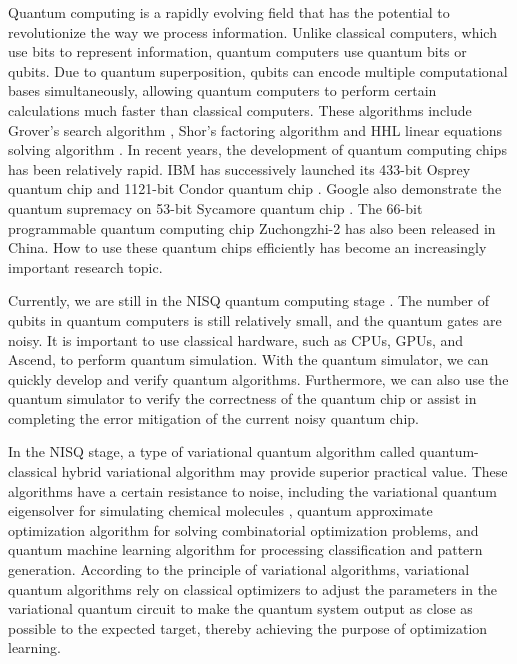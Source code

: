 Quantum computing is a rapidly evolving field that has the potential to revolutionize the way we process information. Unlike classical computers, which use bits to represent information, quantum computers use quantum bits or qubits. Due to quantum superposition, qubits can encode multiple computational bases simultaneously, allowing quantum computers to perform certain calculations much faster than classical computers. These algorithms include Grover's search algorithm \cite{grover1996fast, long2001grover}, Shor's factoring algorithm \cite{shor1994algorithms} and HHL linear equations solving algorithm \cite{harrow2009quantum}. In recent years, the development of quantum computing chips has been relatively rapid. IBM has successively launched its 433-bit Osprey quantum chip \cite{ibm2022osprey} and 1121-bit Condor quantum chip \cite{castelvecchi2023ibm}. Google also demonstrate the quantum supremacy on 53-bit Sycamore quantum chip \cite{arute2019quantum}. The 66-bit programmable quantum computing chip Zuchongzhi-2 \cite{wu2021strong} has also been released in China. How to use these quantum chips efficiently has become an increasingly important research topic.

Currently, we are still in the NISQ quantum computing stage \cite{preskill2018quantum}. The number of qubits in quantum computers is still relatively small, and the quantum gates are noisy. It is important to use classical hardware, such as CPUs, GPUs, and Ascend, to perform quantum simulation. With the quantum simulator, we can quickly develop and verify quantum algorithms. Furthermore, we can also use the quantum simulator to verify the correctness of the quantum chip or assist in completing the error mitigation of the current noisy quantum chip.

In the NISQ stage, a type of variational quantum algorithm \cite{Peruzzo2014Peruzzo2014,cerezo2021variational,PhysRevA.109.052414} called quantum-classical hybrid variational algorithm may provide superior practical value. These algorithms have a certain resistance to noise, including the variational quantum eigensolver for simulating chemical molecules \cite{mcardle2020quantum,cao2019quantum,yeter2020practical,fan2023circuit}, quantum approximate optimization algorithm \cite{farhi2014quantum,PhysRevResearch.4.013141} for solving combinatorial optimization problems, and quantum machine learning algorithm \cite{benedetti2019parameterized,biamonte2017quantum,das2019machine,PhysRevResearch.6.013027} for processing classification and pattern generation. According to the principle of variational algorithms, variational quantum algorithms rely on classical optimizers to adjust the parameters in the variational quantum circuit to make the quantum system output as close as possible to the expected target, thereby achieving the purpose of optimization learning.

